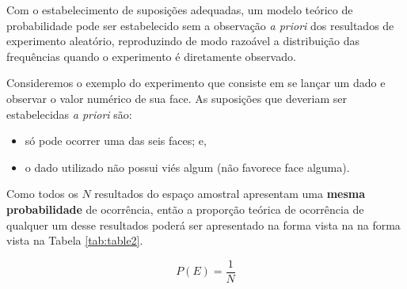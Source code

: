 \documentclass[
]{book}
\providecommand{\tightlist}{%
  \setlength{\itemsep}{0pt}\setlength{\parskip}{0pt}}
\begin{document}
\hfill\break

Com o estabelecimento de suposições adequadas, um modelo teórico de probabilidade pode ser estabelecido sem a observação \emph{a priori} dos resultados de experimento aleatório, reproduzindo de modo razoável a distribuição das frequências quando o experimento é diretamente observado.

\hfill\break

Consideremos o exemplo do experimento que consiste em se lançar um dado e observar o valor numérico de sua face. As suposições que deveriam ser estabelecidas \emph{a priori} são:

\hfill\break

\begin{itemize}
\tightlist
\item
  só pode ocorrer uma das seis faces; e,
\item
  o dado utilizado não possui viés algum (não favorece face alguma).
\end{itemize}

\hfill\break

Como todos os \(N\) resultados do espaço amostral apresentam uma \textbf{mesma probabilidade} de ocorrência, então a proporção teórica de ocorrência de qualquer um desse resultados poderá ser apresentado na forma vista na na forma vista na Tabela \ref{tab:table2}.

\hfill\break

\[
P(E)= \frac{1}{N}
\]

\hfill\break
\end{document}
